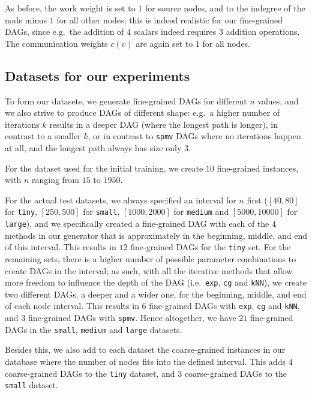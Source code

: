 \documentclass[sigconf,nonacm]{acmart}
\begin{document}
As before, the work weight is set to $1$ for source nodes, and to the indegree of the node minus $1$ for all other nodes; this is indeed realistic for our fine-grained DAGs, since e.g.\ the addition of $4$ scalars indeed requires $3$ addition operations. The communication weights $c(v)$ are again set to $1$ for all nodes.

\subsection{Datasets for our experiments}

To form our datasets, we generate fine-grained DAGs for different $n$ values, and we also strive to produce DAGs of different shape: e.g.\ a higher number of iterations $k$ results in a deeper DAG (where the longest path is longer), in contrast to a smaller $k$, or in contrast to \texttt{spmv} DAGs where no iterations happen at all, and the longest path always has size only $3$.

For the dataset used for the initial training, we create $10$ fine-grained instances, with $n$ ranging from $15$ to $1950$.

For the actual test datasets, we always specified an interval for $n$ first ($[40,80]$ for \texttt{tiny}, $[250,500]$ for \texttt{small}, $[1000,2000]$ for \texttt{medium} and $[5000,10000]$ for \texttt{large}), and we specifically created a fine-grained DAG with each of the $4$ methods in our generator that is approximately in the beginning, middle, and end of this interval. This results in $12$ fine-grained DAGs for the \texttt{tiny} set. For the remaining sets, there is a higher number of possible parameter combinations to create DAGs in the interval; as such, with all the iterative methods that allow more freedom to influence the depth of the DAG (i.e.\ \texttt{exp}, \texttt{cg} and \texttt{kNN}), we create two different DAGs, a deeper and a wider one, for the beginning, middle, and end of each node interval. This results in $6$ fine-grained DAGs with \texttt{exp}, \texttt{cg} and \texttt{kNN}, and $3$ fine-grained DAGs with \texttt{spmv}. Hence altogether, we have $21$ fine-grained DAGs in the \texttt{small}, \texttt{medium} and \texttt{large} datasets.

Besides this, we also add to each dataset the coarse-grained instances in our database where the number of nodes fits into the defined interval. This adds $4$ coarse-grained DAGs to the \texttt{tiny} dataset, and $3$ coarse-grained DAGs to the \texttt{small} dataset.
\end{document}
